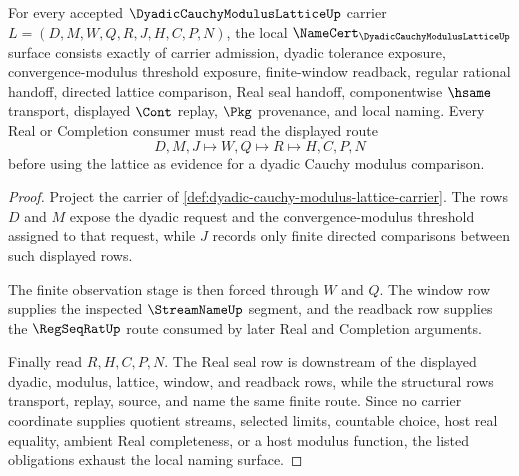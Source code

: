 \begin{theorem}
\label{thm:dyadic-cauchy-modulus-lattice-namecert-obligations}
For every accepted $\DyadicCauchyModulusLatticeUp$ carrier $L=(D,M,W,Q,R,J,H,C,P,N)$, the local $\NameCert_{\DyadicCauchyModulusLatticeUp}$ surface consists exactly of carrier admission, dyadic tolerance exposure, convergence-modulus threshold exposure, finite-window readback, regular rational handoff, directed lattice comparison, Real seal handoff, componentwise $\hsame$ transport, displayed $\Cont$ replay, $\Pkg$ provenance, and local naming. Every Real or Completion consumer must read the displayed route
$$
D,M,J \longmapsto W,Q \longmapsto R \longmapsto H,C,P,N
$$
before using the lattice as evidence for a dyadic Cauchy modulus comparison.
\end{theorem}
\begin{proof}
Project the carrier of \autoref{def:dyadic-cauchy-modulus-lattice-carrier}. The rows $D$ and $M$ expose the dyadic request and the convergence-modulus threshold assigned to that request, while $J$ records only finite directed comparisons between such displayed rows.

The finite observation stage is then forced through $W$ and $Q$. The window row supplies the inspected $\StreamNameUp$ segment, and the readback row supplies the $\RegSeqRatUp$ route consumed by later Real and Completion arguments.

Finally read $R,H,C,P,N$. The Real seal row is downstream of the displayed dyadic, modulus, lattice, window, and readback rows, while the structural rows transport, replay, source, and name the same finite route. Since no carrier coordinate supplies quotient streams, selected limits, countable choice, host real equality, ambient Real completeness, or a host modulus function, the listed obligations exhaust the local naming surface.
\end{proof}

